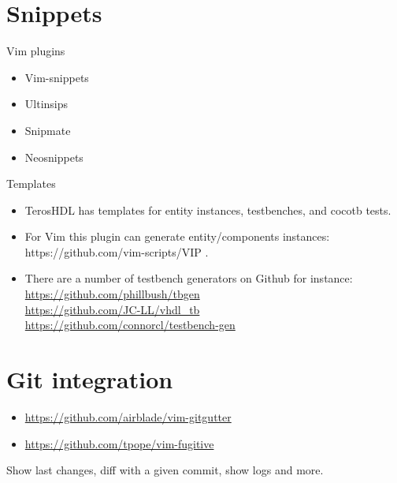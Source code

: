 \documentclass[aspectratio=169]{beamer}
\begin{document}
\section*{Snippets}
\begin{frame}{\secname}
  \begin{block}{Vim plugins}
    \begin{itemize}
      \item Vim-snippets
      \item Ultinsips
      \item Snipmate
      \item Neosnippets
    \end{itemize} 
  \end{block}

  \begin{block}{Templates}
    \begin{itemize}
      \item TerosHDL has templates for entity instances, testbenches, and cocotb tests.
      \item For Vim this plugin can generate entity/components instances: https://github.com/vim-scripts/VIP .
      \item There are a number of testbench generators on Github for instance: \\
        \url{https://github.com/phillbush/tbgen}\\
        \url{https://github.com/JC-LL/vhdl_tb}\\
        \url{https://github.com/connorcl/testbench-gen}\\
    \end{itemize}
    
  \end{block}
    
\end{frame}

\section*{Git integration}
\begin{frame}{\secname}
  \begin{itemize}
    \item \url{https://github.com/airblade/vim-gitgutter}
    \item \url{https://github.com/tpope/vim-fugitive}
  \end{itemize}
  Show last changes, diff with a given commit, show logs and more.
    
\end{frame}
\end{document}
